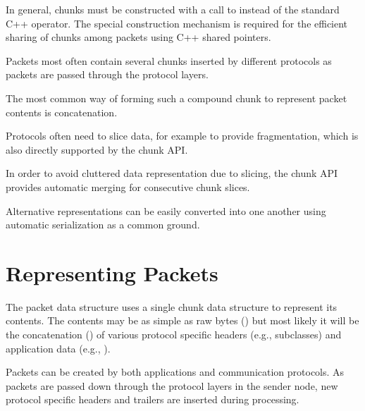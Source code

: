 
In general, chunks must be constructed with a call to 
instead of the standard  C++ operator. The special
construction mechanism is required for the efficient sharing of chunks
among packets using C++ shared pointers.

Packets most often contain several chunks inserted by different protocols
as packets are passed through the protocol layers.

The most common way of forming such a compound chunk to represent packet
contents is concatenation.


Protocols often need to slice data, for example to provide fragmentation,
which is also directly supported by the chunk API.


In order to avoid cluttered data representation due to slicing, the chunk
API provides automatic merging for consecutive chunk slices.


Alternative representations can be easily converted into one another using
automatic serialization as a common ground.



\section{Representing Packets}

The packet data structure uses a single chunk data structure to represent
its contents. The contents may be as simple as raw bytes
() but most likely it will be the concatenation
() of various protocol specific headers (e.g.,
 subclasses) and application data (e.g.,
).

Packets can be created by both applications and communication protocols. As
packets are passed down through the protocol layers in the sender node, new
protocol specific headers and trailers are inserted during processing.

